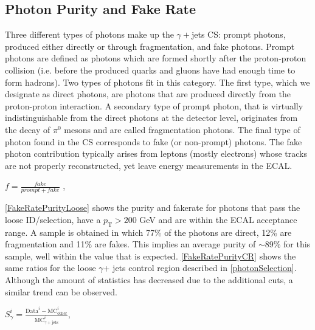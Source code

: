 \subsection{Photon Purity and Fake Rate}\label{purity&fakerate}

Three different types of photons make up the $\gamma+$jets CS: prompt photons, produced either directly or through fragmentation, and fake photons. Prompt photons are defined as photons which are formed shortly after the proton-proton collision (i.e. before the produced quarks and gluons have had enough time to form hadrons). Two types of photons fit in this category. The first type, which we designate as direct photons, are photons that are produced directly from the proton-proton interaction\cite{promptPho}. A secondary type of prompt photon, that is virtually indistinguishable from the direct photons at the detector level, originates from the decay of $\pi^0$ mesons and are called fragmentation photons. The final type of photon found in the CS corresponds to fake (or non-prompt) photons. The fake photon contribution typically arises from leptons (mostly electrons) whose tracks are not properly reconstructed, yet leave energy measurements in the ECAL.

\begingroup
	\large
	\begin{center}
		$f = \frac{fake}{prompt+fake}$ ,
	\end{center}
\endgroup
\vspace{1em}

\autoref{FakeRatePurityLoose} shows the purity and fakerate for photons that pass the loose ID/selection, have a $p_\text{T} > 200$ GeV and are within the ECAL acceptance range. A sample is obtained in which 77\% of the photons are direct, 12\% are fragmentation and 11\% are fakes. This implies an average purity of $\sim$89\% for this sample, well within the value that is expected. \autoref{FakeRatePurityCR} shows the same ratios for the loose $\gamma$+ jets control region described in \autoref{photonSelection}. Although the amount of statistics has decreased due to the additional cuts, a similar trend can be observed.


\begingroup
	\Large
	\begin{center}
		$S^{i}_{\gamma} = \frac{\text{Data}^{i} - \text{M}\text{C}^{i}_\text{other}}{\text{M}\text{C}_{\gamma+\text{jets}}^i}$,
	\end{center}
\endgroup

